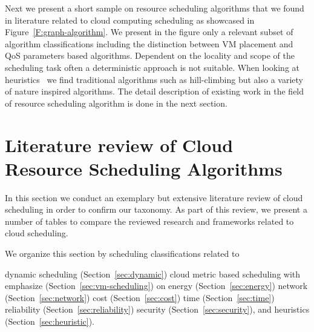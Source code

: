 \documentclass[final,5p,times,twocolumn]{elsarticle}
\begin{document}
Next we present a short sample on resource scheduling algorithms that
we found in literature related to cloud computing scheduling as
showcased in Figure~\ref{F:graph-algorithm}. We present in the
figure only a relevant subset of algorithm classifications including
the distinction between VM placement and QoS parameters based
algorithms. Dependent on the locality and scope of the scheduling task
often a deterministic approach is not suitable. When looking at
heuristics~\cite{vivekanandan2011study} we find traditional algorithms
such as hill-climbing but also a variety of nature inspired
algorithms. The detail description of existing work in the field of
resource scheduling algorithm is done in the next section.









\section{Literature review of Cloud Resource Scheduling Algorithms}\label{sec:literature}



In this section we conduct an exemplary but extensive literature
review of cloud scheduling in order to confirm our taxonomy. As part
of this review, we present a number of tables to compare the reviewed
research and frameworks related to cloud scheduling.

We organize this section by scheduling classifications related to 

dynamic scheduling (Section~\ref{sec:dynamic})
cloud metric based scheduling with emphasize (Section~\ref{sec:vm-scheduling}) on 
energy (Section~\ref{sec:energy})
network (Section~\ref{sec:network})
cost (Section~\ref{sec:cost})
time (Section~\ref{sec:time})
reliability (Section~\ref{sec:reliability})
security (Section~\ref{sec:security}),
and heuristics (Section~\ref{sec:heuristic}).
\end{document}
